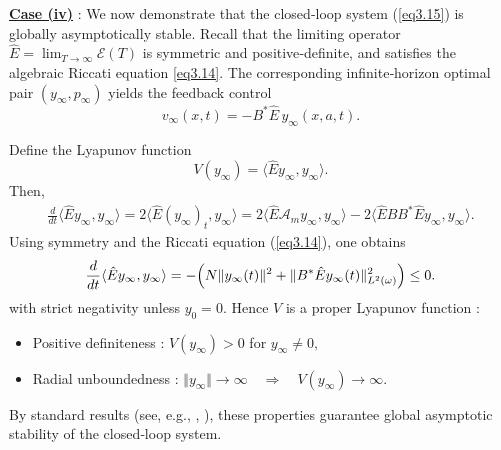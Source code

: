 \documentclass[10pt, a4]{amsart}
\makeatletter
\theoremstyle{plain}
\theoremstyle{definition}
\theoremstyle{remark}
\renewenvironment{proof}[1][\proofname]{\par
  \pushQED{\qed}%
  \normalfont \topsep6\p@\@plus6\p@\relax
  \trivlist
  \item[\hskip\labelsep
        \itshape
    #1\ \ref{#1}.]\ignorespaces
}{%
  \popQED\endtrivlist\@endpefalse
}
\numberwithin{equation}{section}
\def\to{\rightarrow}
\makeatother
\begin{document}
\begin{proof}[of Lemma \ref{le3.4}]
 {\bf \underline{Case (iv)}} : We now demonstrate that the closed‑loop system  (\ref{eq3.15}) is globally asymptotically stable. Recall that the limiting operator $\hat{E}=\lim_{T\to\infty}\mathcal{E}(T)$  is symmetric and positive‑definite, and satisfies the algebraic Riccati equation \eqref{eq3.14}. The corresponding infinite‑horizon optimal pair \((y_\infty, p_\infty)\) yields the feedback control \[
v_{\infty}(x,t) = -B^*\hat{E}\,y_{\infty}(x,a,t).
\]
 
Define  the Lyapunov function
\[
V(y_{\infty}) = \langle\hat{E}y_{\infty}, y_{\infty}\rangle.
\]
Then,
\begin{align}
    \frac{d}{dt}\langle\hat{E}y_{\infty},y_{\infty}\rangle = 2\langle \hat{E}(y_{\infty})_t, y_{\infty}\rangle 
= 2\langle \hat{E}\mathcal{A}_m y_{\infty}, y_{\infty}\rangle - 2\langle \hat{E}BB^*\hat{E}y_{\infty}, y_{\infty}\rangle.
\end{align}
Using symmetry and the Riccati equation  (\ref{eq3.14}), one obtains
\begin{align}
    \frac{d}{dt}\langle\hat{E}y_{\infty},y_{\infty}\rangle = -\Bigl( N\Vert y_{\infty}(t)\Vert^2 + \Vert B^*\hat{E}y_{\infty}(t)\Vert^2_{L^2(\omega)} \Bigr)\leq 0.
\end{align}
with strict negativity unless $y_0=0.$ Hence $V$ is a proper Lyapunov function :
\begin{itemize}
    \item Positive definiteness : $V(y_{\infty})>0$ for $y_{\infty}\neq 0,$
    \item  Radial unboundedness :  $\Vert y_{\infty}\Vert\to\infty \quad\Longrightarrow\quad V(y_{\infty})\to\infty.$
\end{itemize}
By standard results (see, e.g., \cite[Theorem 12.2]{ref21}, \cite[Theorem 1.2.3]{ref61}),  these properties guarantee global asymptotic stability of the closed‑loop system.


\end{proof}
\end{document}
